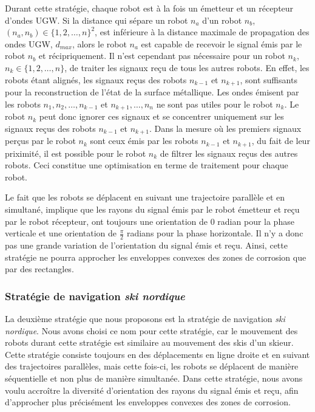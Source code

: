 \documentclass[francais,RandD]{rapportPFE}
\begin{document}
				Durant cette stratégie, chaque robot est à la fois un émetteur et un récepteur d'ondes UGW.
				Si la distance qui sépare un robot $n_a$ d'un robot $n_b$, $(n_a, n_b) \in \{1, 2, \dots, n\}^2$, est inférieure à la distance maximale de propagation des ondes UGW, $d_{max}$, alors le robot $n_a$ est capable de recevoir le signal émis par le robot $n_b$ et récipriquement.
				Il n'est cependant pas nécessaire pour un robot $n_k$, $n_k \in \{1, 2, \dots, n\}$, de traiter les signaux reçu de tous les autres robots.
				En effet, les robots étant alignés, les signaux reçus des robots $n_{k-1}$ et $n_{k+1}$, sont suffisants pour la reconstruction de l'état de la surface métallique.
				Les ondes émisent par les robots $n_1, n_2, \dots, n_{k-1}$ et $n_{k+1}, \dots, n_n$ ne sont pas utiles pour le robot $n_k$.
				Le robot $n_k$ peut donc ignorer ces signaux et se concentrer uniquement sur les signaux reçus des robots $n_{k-1}$ et $n_{k+1}$.
				Dans la mesure où les premiers signaux perçus par le robot $n_k$ sont ceux émis par les robots $n_{k-1}$ et $n_{k+1}$, du fait de leur priximité, il est possible pour le robot $n_k$ de filtrer les signaux reçus des autres robots.
				Ceci constitue une optimisation en terme de traitement pour chaque robot.

				Le fait que les robots se déplacent en suivant une trajectoire parallèle et en simultané, implique que les rayons du signal émis par le robot émetteur et reçu par le robot récepteur, ont toujours une orientation de $0$ radian pour la phase verticale et une orientation de $\frac{\pi}{2}$ radians pour la phase horizontale.
				Il n'y a donc pas une grande variation de l'orientation du signal émis et reçu.
				Ainsi, cette stratégie ne pourra approcher les enveloppes convexes des zones de corrosion que par des rectangles.
			\subsubsection*{Stratégie de navigation \textit{ski nordique}}
				La deuxième stratégie que nous proposons est la stratégie de navigation \textit{ski nordique}.
				Nous avons choisi ce nom pour cette stratégie, car le mouvement des robots durant cette stratégie est similaire au mouvement des skis d'un skieur.
				Cette stratégie consiste toujours en des déplacements en ligne droite et en suivant des trajectoires parallèles, mais cette fois-ci, les robots se déplacent de manière séquentielle et non plus de manière simultanée.
				Dans cette stratégie, nous avons voulu accroître la diversité d'orientation des rayons du signal émis et reçu, afin d'approcher plus précisément les enveloppes convexes des zones de corrosion.
\end{document}
